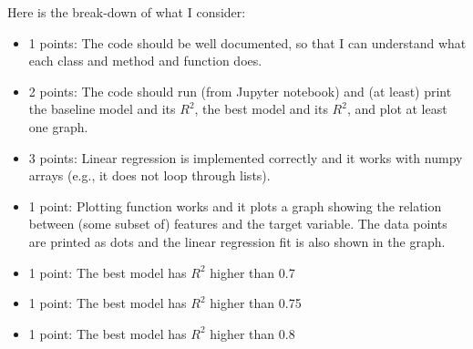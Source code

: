 \documentclass[11pt, leqno, a4paper]{article}
\begin{document}
Here is the break-down of what I consider:
\begin{itemize}
    \item 1 points: The code should be well documented, so that I can understand what each class and method and function does. 
    \item 2 points: The code should run (from Jupyter notebook) and (at least) print the baseline model and its $R^2$, the best model and its $R^2$, and plot at least one graph.
    \item 3 points: Linear regression is implemented correctly and it works with numpy arrays (e.g., it does not loop through lists).
    \item 1 point: Plotting function works and it plots a graph showing the relation between (some subset of) features and the target variable. The data points are printed as dots and the linear regression fit is also shown in the graph.
    \item 1 point: The best model has $R^2$ higher than 0.7
    \item 1 point: The best model has $R^2$ higher than 0.75
    \item 1 point: The best model has $R^2$ higher than 0.8
\end{itemize}
\end{document}
